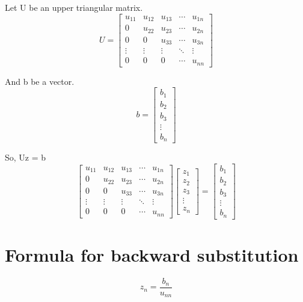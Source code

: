 \documentclass[11pt]{article}
\begin{document}
    Let U be an upper triangular matrix. \[U = \begin{bmatrix}
    u_{11} & u_{12} & u_{13} & \cdots & u_{1n} \\
    0 & u_{22} & u_{23} & \cdots & u_{2n} \\
    0 & 0 & u_{33} & \cdots & u_{3n} \\
    \vdots & \vdots & \vdots & \ddots & \vdots \\
    0 & 0 & 0 & \cdots & u_{nn}
\end{bmatrix}\]

    And b be a vector. \[b = \begin{bmatrix}
    b_{1}\\
    b_{2}\\
    b_{3}\\
    \vdots\\
    b_{n}
\end{bmatrix}\]

    So, Uz = b \[\begin{bmatrix}
    u_{11} & u_{12} & u_{13} & \cdots & u_{1n} \\
    0 & u_{22} & u_{23} & \cdots & u_{2n} \\
    0 & 0 & u_{33} & \cdots & u_{3n} \\
    \vdots & \vdots & \vdots & \ddots & \vdots \\
    0 & 0 & 0 & \cdots & u_{nn}
\end{bmatrix} \begin{bmatrix}
    z_{1}\\
    z_{2}\\
    z_{3}\\
    \vdots\\
    z_{n}
\end{bmatrix} = \begin{bmatrix}
    b_{1}\\
    b_{2}\\
    b_{3}\\
    \vdots\\
    b_{n}
\end{bmatrix}\]

    \hypertarget{formula-for-backward-substitution}{%
\section{Formula for backward
substitution}\label{formula-for-backward-substitution}}

    \[z_n = \frac{b_{n}}{u_{nn}}\]
\end{document}
